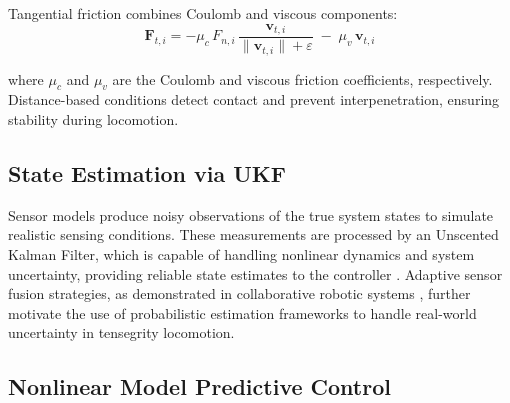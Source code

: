 \documentclass[conference]{IEEEtran}
\begin{document}
Tangential friction combines Coulomb and viscous components:
%
\begin{equation}
\label{eq:friction}
\mathbf{F}_{t,i} = -\mu_c\,F_{n,i}\,
\frac{\mathbf{v}_{t,i}}{\|\mathbf{v}_{t,i}\| + \varepsilon}
\;-\; \mu_v\,\mathbf{v}_{t,i}
\end{equation}

where $\mu_c$ and $\mu_v$ are the Coulomb and viscous friction coefficients,
respectively. Distance-based conditions detect contact and prevent
interpenetration, ensuring stability during locomotion.

\subsection{State Estimation via UKF}

Sensor models produce noisy observations of the true system states to simulate
realistic sensing conditions. These measurements are processed by an Unscented
Kalman Filter, which is capable of handling nonlinear dynamics and system
uncertainty, providing reliable state estimates to the controller \cite{b7}.
Adaptive sensor fusion strategies, as demonstrated in collaborative robotic
systems \cite{b20}, further motivate the use of probabilistic estimation
frameworks to handle real-world uncertainty in tensegrity locomotion.

\subsection{Nonlinear Model Predictive Control}
\end{document}
